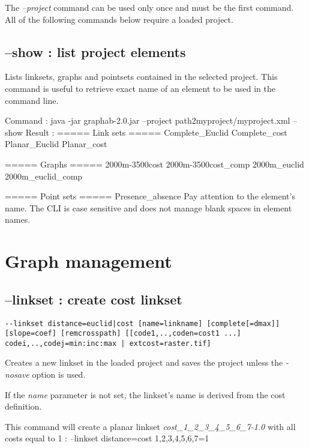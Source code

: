 \documentclass[a4paper,10pt]{report}
\newenvironment{cmd}
{\quote\Verbatim}
{\endVerbatim\endquote}
\begin{document}
The \textit{--project} command can be used only once and must be the first command.
All of the following commands below require a loaded project. 

\subsection{--show : list project elements}
Lists linksets, graphs and pointsets contained in the selected project. This command is useful to retrieve exact name of an element to be used in the command line.

Command :
\begin{cmd}
java -jar graphab-2.0.jar --project path2myproject/myproject.xml --show
\end{cmd}
Result :
\begin{cmd}
===== Link sets =====
Complete_Euclid
Complete_cost
Planar_Euclid
Planar_cost

===== Graphs =====
2000m-3500cost
2000m-3500cost_comp
2000m_euclid
2000m_euclid_comp

===== Point sets =====
Presence_absence
\end{cmd}
Pay attention to the element's name. The CLI is case sensitive and does not manage blank spaces in element names.

\section{Graph management}

\subsection{--linkset : create cost linkset}
\begin{verbatim}
--linkset distance=euclid|cost [name=linkname] [complete[=dmax]] [slope=coef] [remcrosspath] [[code1,..,coden=cost1 ...] codei,..,codej=min:inc:max | extcost=raster.tif]
\end{verbatim}
Creates a new linkset in the loaded project and saves the project unless the \textit{-nosave} option is used. 

If the \textit{name} parameter is not set, the linkset's name is derived from the cost definition.

This command will create a planar linkset \textit{cost\_1\_2\_3\_4\_5\_6\_7-1.0} with all costs equal to 1 :
\begin{cmd}
--linkset distance=cost 1,2,3,4,5,6,7=1
\end{cmd}
\end{document}
